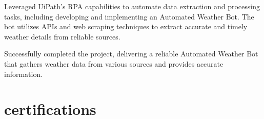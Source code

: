 \documentclass[]{deedy-resume-openfont}
\begin{document}
\begin{minipage}[t]{0.66\textwidth}
\begin{tightemize}
\end{tightemize}
\sectionsep

\begin{tightemize}
\item Leveraged UiPath's RPA capabilities to automate data extraction and processing tasks, including developing and implementing an Automated Weather Bot. The bot utilizes APIs and web scraping techniques to extract accurate and timely weather details from reliable sources.
\item Successfully completed the project, delivering a reliable Automated Weather Bot that gathers weather data from various sources and provides accurate information.
\end{tightemize}
\sectionsep




\sectionsep
\vspace{10pt} %


\section{certifications} 
\vspace{10pt} %
\renewcommand\refname{\vskip -1.5em} %
\begin{tightemize}
\item {} 
\item {}  
\item {}  
\item {} 




\end{tightemize}

\end{minipage} 
\end{document}

